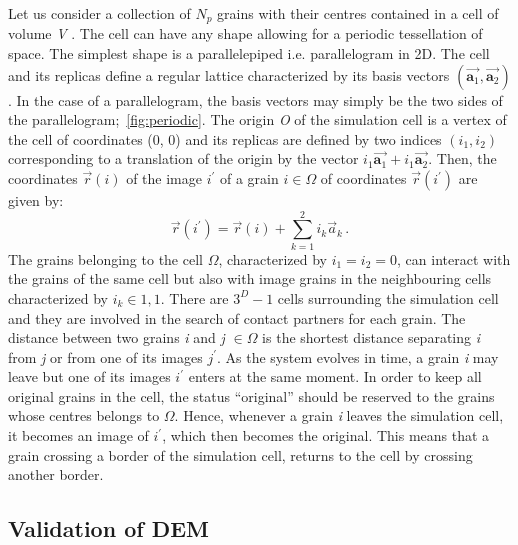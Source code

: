Let us consider a collection of $N_{p}$ grains with their centres contained 
in a cell of volume \textit{V} . The cell can have any shape allowing for a 
periodic tessellation of space. The simplest shape is a parallelepiped i.e. 
parallelogram in 2D. The cell and its replicas define a regular lattice 
characterized by its basis vectors 
$(\overrightarrow{\mathbf{a}_{1}},\overrightarrow{\mathbf{a}_{2}})$. In the 
case of a parallelogram, the basis vectors may simply be the two sides of the 
parallelogram;~\cref{fig:periodic}. The origin \textit{O} of the simulation 
cell is a vertex of the cell of coordinates (0, 0) and its replicas are defined 
by two indices $(i_{1}, i_{2})$ corresponding to a translation of the origin by 
the vector 
$i_{1}\overrightarrow{\mathbf{a}_{1}}+i_{1}\overrightarrow{\mathbf{a}_{2}}$. 
Then, the coordinates $\overrightarrow{r}(\mathit{i})$ of the image 
$\mathit{i}^{\prime}$ of a grain $\mathit{i} \in \Omega$ of coordinates  
$\overrightarrow{r}(\mathit{i}^{\prime})$ are given by:
%
\begin{equation}
\overrightarrow{r}(i^{\prime})=\overrightarrow{r}(i)+\sum\limits_{k=1}^{2}
{\mathit{i}_{\mathit{k}}\overrightarrow{\mathbf{\mathit{a}}}_{\mathit{k}}} \,.
\end{equation}
%
The grains belonging to the cell $\Omega$, characterized by $\mathit{i}_{1} 
= \mathit{i}_{2} = 0$, can interact with the grains of the same cell but also 
with image grains in the neighbouring cells characterized by $\mathit{i}_{k}\in 
{1, 1}$. There are $3^{D} - 1$ cells surrounding the simulation cell and they 
are involved in the search of contact partners for each grain. The distance 
between two grains \textit{i} and \textit{j} $\in \Omega$ is the shortest 
distance separating \textit{i} from \textit{j} or from one of its images 
$\mathit{j}^{\prime}$. As the system evolves in time, a grain \textit{i} may 
leave but one of its images $\mathit{i}^{\prime}$ enters at the same moment. In 
order to keep all original grains in the cell, the status ``original'' should 
be reserved to the grains whose centres belongs to $\Omega$. Hence, whenever a 
grain \textit{i} leaves the simulation cell, it becomes an image of 
$\mathit{i}^{\prime}$, which then becomes the original. This means that a 
grain crossing a border of the simulation cell, returns to the cell by crossing 
another border.


\subsection{Validation of DEM}

